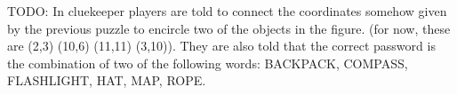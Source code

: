 TODO: In cluekeeper players are told to connect the coordinates
somehow given by the previous puzzle to encircle two of the objects in
the figure. (for now, these are (2,3) (10,6) (11,11) (3,10)).
They are also told that the correct password is the combination
of two of the following words: 
BACKPACK, COMPASS, FLASHLIGHT, HAT, MAP, ROPE.
